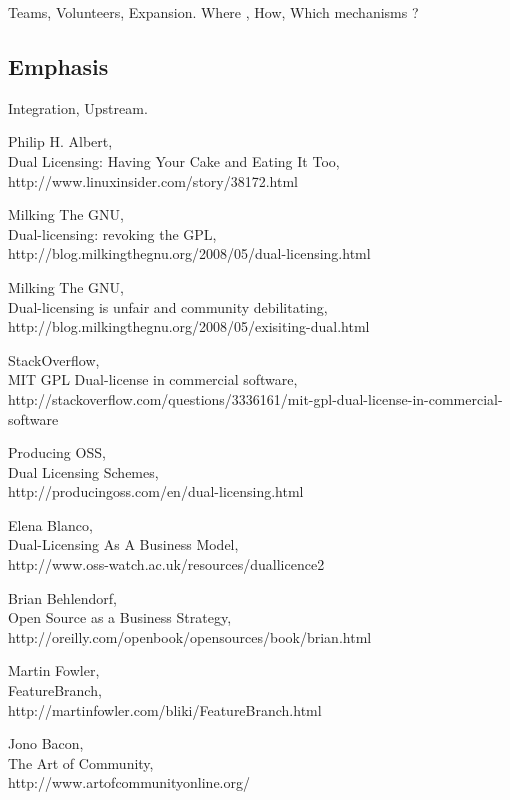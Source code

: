 \documentclass[11pt]{scrartcl}
\begin{document}
\par Teams, Volunteers, Expansion. Where , How, Which mechanisms ?


\subsection{Emphasis}
\label{sub:emphasis}

\par Integration, Upstream.


\begin{thebibliography}{9}

    Philip H. Albert,\\
    Dual Licensing: Having Your Cake and Eating It Too,\\
    http://www.linuxinsider.com/story/38172.html

    Milking The GNU,\\
    Dual-licensing: revoking the GPL,\\
    http://blog.milkingthegnu.org/2008/05/dual-licensing.html

    Milking The GNU,\\
    Dual-licensing is unfair and community debilitating,\\
    http://blog.milkingthegnu.org/2008/05/exisiting-dual.html

    StackOverflow,\\
    MIT GPL Dual-license in commercial software,\\
    http://stackoverflow.com/questions/3336161/mit-gpl-dual-license-in-commercial-software

    Producing OSS,\\
    Dual Licensing Schemes,\\
    http://producingoss.com/en/dual-licensing.html

    Elena Blanco,\\
    Dual-Licensing As A Business Model,\\
    http://www.oss-watch.ac.uk/resources/duallicence2

    Brian Behlendorf,\\
    Open Source as a Business Strategy,\\
    http://oreilly.com/openbook/opensources/book/brian.html
    
    Martin Fowler,\\
    FeatureBranch,\\
    http://martinfowler.com/bliki/FeatureBranch.html
    
    Jono Bacon,\\
    The Art of Community,\\
    http://www.artofcommunityonline.org/
\end{thebibliography}
\end{document}
